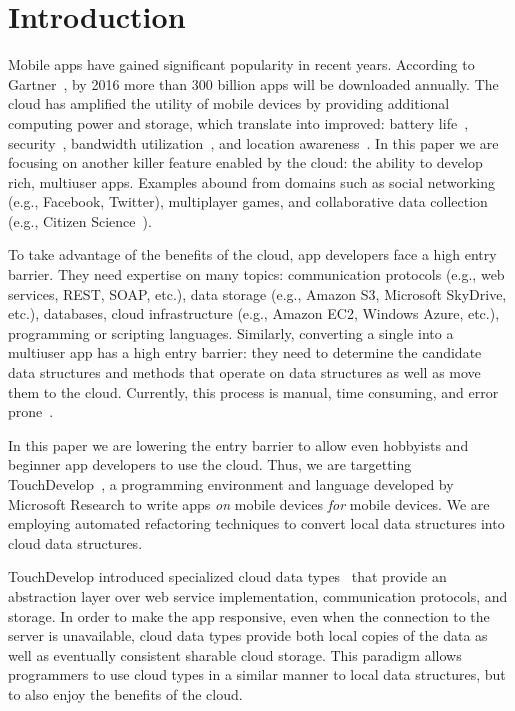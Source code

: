 \documentclass{sigplanconf}
\begin{document}
\section{Introduction}

Mobile apps have gained significant popularity in recent years. According to Gartner~\cite{Gartner}, by 2016 more than 300 billion apps will be downloaded annually. The cloud has amplified the utility of mobile devices by providing additional computing power and storage, which translate into improved: battery life~\cite{Chen:2012:CCO:2310096.2310228}, security~\cite{Oberheide:2008:VIS:1622103.1629656}, bandwidth utilization~\cite{Vemulapalli:2013:PSD:2492348.2492353}, and location awareness~\cite{kansal2013latency}. In this paper we are focusing on another killer feature enabled by the cloud: the ability to develop rich, multiuser apps. Examples abound from domains such as social networking (e.g., Facebook, Twitter), multiplayer games, and collaborative data collection (e.g., Citizen Science~\cite{cohn2008citizen}). 

To take advantage of the benefits of the cloud, app developers face a high entry barrier. They need expertise on many topics: communication protocols (e.g., web services, REST, SOAP, etc.), data storage (e.g., Amazon S3, Microsoft SkyDrive, etc.), databases, cloud infrastructure (e.g., Amazon EC2, Windows Azure, etc.),  programming or scripting languages. Similarly, converting a single into a multiuser app has a high entry barrier: they need to determine the candidate data structures and methods that operate on data structures as well as move them to the cloud. Currently, this process is manual, time consuming, and error prone~\cite{khan2013survey}.

In this paper we are lowering the entry barrier to allow even hobbyists and beginner app developers to use the cloud. Thus, we are targetting TouchDevelop~\cite{Tillmann2011TPC20482372048245}, a programming environment and language developed by Microsoft Research to write apps \emph{on} mobile devices \emph{for} mobile devices. We are employing automated refactoring techniques to convert local data structures into cloud data structures.

TouchDevelop introduced specialized cloud data types~\cite{burckhardt2012cloud} that provide an abstraction layer over web service implementation, communication protocols, and storage.  In order to make the app responsive, even when the connection to the server is unavailable, cloud data types provide both local copies of the data as well as eventually consistent sharable cloud storage. This paradigm allows programmers to use cloud types in a similar manner to local data structures, but to also enjoy the benefits of the cloud.
\end{document}

